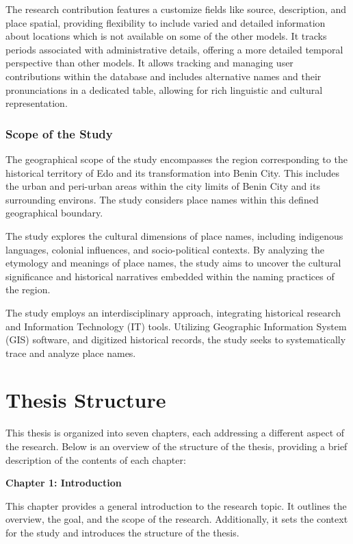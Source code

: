 The research contribution features a customize fields like source, description, and place spatial, providing flexibility to include varied and detailed information about locations which is not available on some of the other models. It tracks periods associated with administrative details, offering a more detailed temporal perspective than other models. It allows tracking and managing user contributions within the database and includes alternative names and their pronunciations in a dedicated table, allowing for rich linguistic and cultural representation.

\subsubsection{Scope of the Study}
The geographical scope of the study encompasses the region corresponding to the historical territory of Edo and its transformation into Benin City. This includes the urban and peri-urban areas within the city limits of Benin City and its surrounding environs. The study considers place names within this defined geographical boundary.


The study explores the cultural dimensions of place names, including indigenous languages, colonial influences, and socio-political contexts. By analyzing the etymology and meanings of place names, the study aims to uncover the cultural significance and historical narratives embedded within the naming practices of the region.


The study employs an interdisciplinary approach, integrating historical research and Information Technology (IT) tools. Utilizing Geographic Information System (GIS) software, and digitized historical records, the study seeks to systematically trace and analyze place names.

\section{Thesis Structure}

This thesis is organized into seven chapters, each addressing a different aspect of the research. Below is an overview of the structure of the thesis, providing a brief description of the contents of each chapter:

\textbf{Chapter 1: Introduction}

This chapter provides a general introduction to the research topic. It outlines the overview, the goal, and the scope of the research. Additionally, it sets the context for the study and introduces the structure of the thesis.


